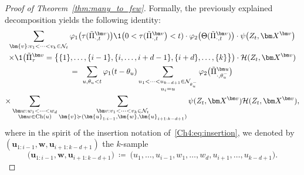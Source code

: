 \begin{refsegment}
\begin{proof}[Proof of Theorem~\ref{thm:many_to_few}]
Formally, the previously explained decomposition yields the following identity:
\begin{multline}\label{Ch4:eq:decomposition_first_coal}
\sum_{\bm{v}:v_1<\cdots<v_k\in\mathcal{N}_t}\varphi_1\big(\tau(\tilde{\Pi}^{\bm v}_{\cdot,t})\big)\1\big(0<\tau(\tilde{\Pi}^{\bm v}_{\cdot,t}\big) < t)\cdot \varphi_2\big(\Theta(\tilde{\Pi}^{\bm v}_{\cdot,t})\big)\cdot \psi\big(Z_t, \bm X^{\bm v}\big) \\
\times \1\big( \tilde{\Pi}^{\bm v}_{\tau}= \big\{\{1\},\ldots,\{i-1\},\{i,\ldots, i+d-1\},\{i+d\},\ldots,\{k\}\big\}\big)\cdot\mathcal{H}(Z_t,\bm X^{\bm v})\\ =\  
\sum_{u, \theta_u<t} \varphi_1(t-\theta_u) \sum_{\substack{u_1<\cdots<u_{k-d+1}\in\mathcal{N}_{\theta_u^-}\\ u_i=u}} \varphi_2\big(\tilde{\Pi}^{\bm u}_{\cdot,\theta_u^-}\big) 
\\ 
\times \sum_{\substack{\bm w: w_1<\cdots<w_d\\ \bm w\in \mathrm{Ch}(u)}}  \sum _{\substack{\bm v: v_1<\cdots<v_k\in \mathcal{N}_t\\
    \bm{v}\succcurlyeq  (\bm{u}_{1:i-1}, \bm{w}, \bm{u}_{i+1:k-d+1})}}\psi(Z_t, \bm X^{\bm v})\mathcal{H}(Z_t,\bm X^{\bm v}), 
\end{multline}
where in the spirit of the insertion notation of~\eqref{Ch4:eq:insertion}, we denoted by $(\bm{u}_{1:i-1}, \bm{w}, \bm{u}_{i+1:k-d+1})$ the $k$-sample
\[
  \big(\bm{u}_{1:i-1}, \bm{w}, \bm{u}_{i+1:k-d+1}\big)\ \coloneqq\ \big(u_1,\ldots, u_{i-1}, w_1, \ldots, w_d, u_{i+1},\ldots, u_{k-d+1}\big).
\]



\end{proof}
\end{refsegment}
